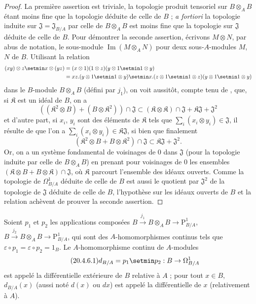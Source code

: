 \begin{proof}
La première assertion est triviale, la topologie produit tensoriel sur
$B\otimes_A B$ étant moins fine que la topologie déduite de celle de $B$ ;
\emph{a fortiori} la topologie induite sur
$\mathfrak{J}=\mathfrak{J}_{B/A}$
par celle de $B\otimes_A B$ est moins fine que la topologie sur $\mathfrak{J}$
déduite de celle de $B$. Pour démontrer la seconde assertion, écrivons
$M\otimes N$, par abus de notation, le sous-module
$\operatorname{Im}(M\otimes_A N)$ pour deux sous-$A$-modules $M$, $N$ de $B$.
Utilisant la relation
\[
\begin{aligned}
  (xy)\otimes z\setmin x\otimes(yz)
  &=(x\otimes1)(1\otimes z)(y\otimes1\setmin 1\otimes y)\\
  &=xz.(y\otimes1\setmin 1\otimes y)
    \setmin x.(z\otimes1\setmin 1\otimes z)(y\otimes1\setmin 1\otimes y)
\end{aligned}
\]
dans le $B$-module $B\otimes_A B$ (défini par $j_1$), on voit aussitôt,
compte tenu de , que, si $\mathfrak{K}$ est un idéal de
$B$, on a
\[
  ((\mathfrak{K}^2\otimes B)+(B\otimes\mathfrak{K}^2))\cap\mathfrak{J}
  \subset(\mathfrak{K}\otimes\mathfrak{K})\cap\mathfrak{J}
  +\mathfrak{K}\mathfrak{J}+\mathfrak{J}^2
\]
et d'autre part, si $x_i$, $y_i$ sont des éléments de $\mathfrak{K}$ tels
que $\sum_i(x_i\otimes y_i)\in\mathfrak{J}$, il résulte de
 que l'on a
$\sum_i(x_i\otimes y_i)\in\mathfrak{K}\mathfrak{J}$, si bien que finalement
\begin{equation}
\tag{20.4.5.1}
\label{0.20.4.5.1-fr}
  (\mathfrak{K}^2\otimes B+B\otimes\mathfrak{K}^2)\cap\mathfrak{J}
  \subset\mathfrak{K}\mathfrak{J}+\mathfrak{J}^2.
\end{equation}
Or, on a un système fondamental de voisinages de $0$ dans $\mathfrak{J}$
(pour la topologie induite par celle de $B\otimes_A B$) en prenant pour
voisinages de $0$ les ensembles
$(\mathfrak{K}\otimes B+B\otimes\mathfrak{K})\cap\mathfrak{J}$, où
$\mathfrak{K}$ parcourt l'ensemble des idéaux ouverts. Comme la topologie de
$\Omega^1_{B/A}$ déduite de celle de $B$ est aussi le quotient par
$\mathfrak{J}^2$ de la topologie de $\mathfrak{J}$ déduite de celle de $B$,
l'hypothèse sur les idéaux ouverts de $B$ et la relation
 achèvent de prouver la seconde assertion.
\end{proof}

\begin{definition}[20.4.6]
\label{0.20.4.6-fr}
Soient $p_1$ et $p_2$ les applications composées
$B\xrightarrow{j_1}B\otimes_A B\to\mathrm{P}^1_{B/A}$,
$B\xrightarrow{j_2}B\otimes_A B\to\mathrm{P}^1_{B/A}$, qui sont des
$A$-homomorphismes continus tels que
$\varepsilon\circ p_1=\varepsilon\circ p_2=1_B$. Le
$A$-homomorphisme continu de $A$-modules
\begin{equation}
\tag{20.4.6.1}
\label{0.20.4.6.1-fr}
  d_{B/A}=p_1\setmin p_2:B\to\Omega^1_{B/A}
\end{equation}
est appelé la différentielle extérieure de $B$ relative à $A$ ; pour
tout $x\in B$, $d_{B/A}(x)$ (aussi noté $d(x)$ ou $dx$) est appelé la
différentielle de $x$ (relativement à $A$).
\end{definition}

